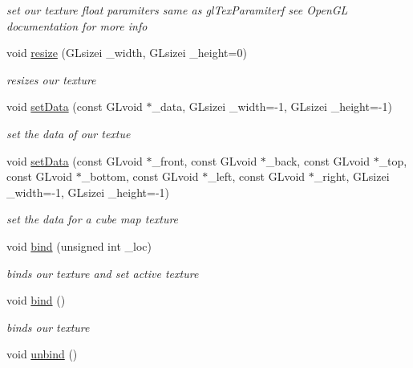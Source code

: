 \begin{DoxyCompactItemize}
\begin{DoxyCompactList}\small\item\em set our texture float paramiters same as gl\-Tex\-Paramiterf see Open\-G\-L documentation for more info \end{DoxyCompactList}\item 
void \hyperlink{class_g_l_texture_a5b70c5df1d184c9be005b0ed05f1e808}{resize} (G\-Lsizei \-\_\-width, G\-Lsizei \-\_\-height=0)
\begin{DoxyCompactList}\small\item\em resizes our texture \end{DoxyCompactList}\item 
void \hyperlink{class_g_l_texture_a9214dfefb40db4fbb7450bcc0ba70b61}{set\-Data} (const G\-Lvoid $\ast$\-\_\-data, G\-Lsizei \-\_\-width=-\/1, G\-Lsizei \-\_\-height=-\/1)
\begin{DoxyCompactList}\small\item\em set the data of our textue \end{DoxyCompactList}\item 
\hypertarget{class_g_l_texture_af20871f52b9705409078558a33a2c73d}{void \hyperlink{class_g_l_texture_af20871f52b9705409078558a33a2c73d}{set\-Data} (const G\-Lvoid $\ast$\-\_\-front, const G\-Lvoid $\ast$\-\_\-back, const G\-Lvoid $\ast$\-\_\-top, const G\-Lvoid $\ast$\-\_\-bottom, const G\-Lvoid $\ast$\-\_\-left, const G\-Lvoid $\ast$\-\_\-right, G\-Lsizei \-\_\-width=-\/1, G\-Lsizei \-\_\-height=-\/1)}\label{class_g_l_texture_af20871f52b9705409078558a33a2c73d}

\begin{DoxyCompactList}\small\item\em set the data for a cube map texture \end{DoxyCompactList}\item 
void \hyperlink{class_g_l_texture_a8fcf4e5253bccd04ffe6e65af228dabc}{bind} (unsigned int \-\_\-loc)
\begin{DoxyCompactList}\small\item\em binds our texture and set active texture \end{DoxyCompactList}\item 
\hypertarget{class_g_l_texture_a3d26fc3a017fd2079ab67e422f9bac10}{void \hyperlink{class_g_l_texture_a3d26fc3a017fd2079ab67e422f9bac10}{bind} ()}\label{class_g_l_texture_a3d26fc3a017fd2079ab67e422f9bac10}

\begin{DoxyCompactList}\small\item\em binds our texture \end{DoxyCompactList}\item 
\hypertarget{class_g_l_texture_a96090b31b8d550a50eb1d4bed1055774}{void \hyperlink{class_g_l_texture_a96090b31b8d550a50eb1d4bed1055774}{unbind} ()}\label{class_g_l_texture_a96090b31b8d550a50eb1d4bed1055774}


\end{DoxyCompactItemize}
